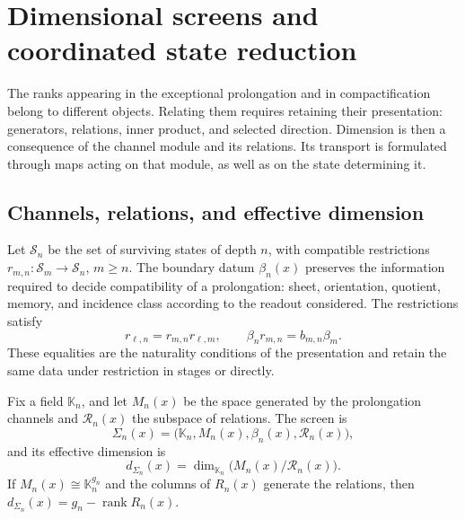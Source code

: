 \section{Dimensional screens and coordinated state reduction}
\label{iv:pantallas}

The ranks appearing in the exceptional prolongation and in
compactification belong to different objects. Relating them
requires retaining their presentation: generators, relations, inner
product, and selected direction. Dimension is then a
consequence of the channel module and its relations. Its
transport is formulated through maps acting on that module,
as well as on the state determining it.

\subsection{Channels, relations, and effective dimension}

Let \(\mathcal S_n\) be the set of surviving states of
depth \(n\), with compatible restrictions
\(r_{m,n}:\mathcal S_m\to\mathcal S_n\), \(m\geq n\).
The boundary datum \(\beta_n(x)\) preserves the information
required to decide compatibility of a prolongation:
sheet, orientation, quotient, memory, and incidence class according to
the readout considered. The restrictions satisfy
\[
 r_{\ell,n}=r_{m,n}r_{\ell,m},\qquad
 \beta_n r_{m,n}=b_{m,n}\beta_m.
\]
These equalities are the naturality conditions of the
presentation and retain the same data under restriction
in stages or directly.

\begin{definition}
\label{iv:def:pantalla}
Fix a field \(\mathbb K_n\), and let \(M_n(x)\) be the space
generated by the prolongation channels and \(\mathcal R_n(x)\)
the subspace of relations. The screen is
\[
 \Sigma_n(x)=\bigl(\mathbb K_n,M_n(x),\beta_n(x),
                    \mathcal R_n(x)\bigr),
\]
and its effective dimension is
\begin{equation}
 d_{\Sigma_n}(x)=\dim_{\mathbb K_n}
                    \bigl(M_n(x)/\mathcal R_n(x)\bigr).
 \label{iv:eq:dimension-pantalla}
\end{equation}
If \(M_n(x)\cong\mathbb K_n^{g_n}\) and the columns of
\(R_n(x)\) generate the relations, then
\(d_{\Sigma_n}(x)=g_n-\operatorname{rank}R_n(x)\).
\end{definition}

